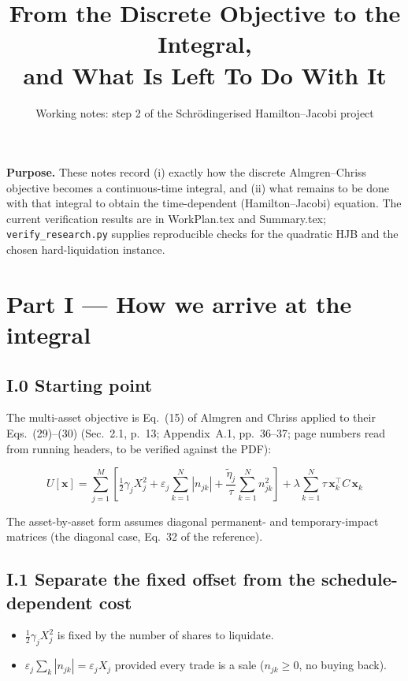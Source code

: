 \documentclass[11pt,a4paper]{article}
\title{From the Discrete Objective to the Integral,\\and What Is Left To Do With It}
\author{Working notes: step 2 of the Schr\"odingerised Hamilton--Jacobi project}
\date{}
\begin{document}
\maketitle

\noindent\textbf{Purpose.} These notes record (i) exactly how the discrete
Almgren--Chriss objective becomes a continuous-time integral, and (ii) what
remains to be done with that integral to obtain the time-dependent
(Hamilton--Jacobi) equation. The current verification results are in WorkPlan.tex and Summary.tex;
\texttt{verify\_research.py} supplies reproducible checks for the quadratic
HJB and the chosen hard-liquidation instance.

\section*{Part I --- How we arrive at the integral}

\subsection*{I.0 Starting point}

The multi-asset objective is Eq.~(15) of Almgren and Chriss applied to their
Eqs.~(29)--(30) (Sec.~2.1, p.~13; Appendix~A.1, pp.~36--37; page numbers read
from running headers, to be verified against the PDF):

\begin{equation}
  U[\mathbf{x}]
  = \sum_{j=1}^{M}\left[
      \tfrac{1}{2}\gamma_j X_j^2
      + \varepsilon_j \sum_{k=1}^{N}|n_{jk}|
      + \frac{\tilde{\eta}_j}{\tau}\sum_{k=1}^{N} n_{jk}^2
    \right]
  + \lambda \sum_{k=1}^{N} \tau\,\mathbf{x}_k^\top C\,\mathbf{x}_k
  \label{eq:disc}
\end{equation}

The asset-by-asset form assumes diagonal permanent- and temporary-impact
matrices (the diagonal case, Eq.~32 of the reference).

\subsection*{I.1 Separate the fixed offset from the schedule-dependent cost}

\begin{itemize}[leftmargin=1.5em]
  \item $\tfrac12\gamma_jX_j^2$ is fixed by the number of shares to liquidate.
  \item $\varepsilon_j\sum_k|n_{jk}|=\varepsilon_jX_j$ provided every trade is a
        sale ($n_{jk}\ge0$, no buying back).
\end{itemize}
\end{document}

